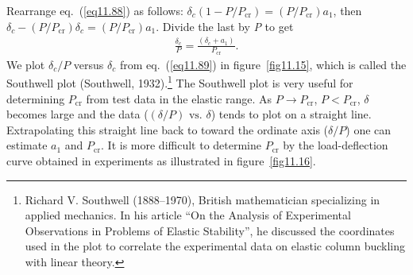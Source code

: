 \documentclass{AeroStructure-ERJohnson}
\begin{document}
Rearrange eq.~(\ref{eq11.88}) as follows: $\delta_{c}\left(1-P/P_{\textrm{cr}}\right)=\left(P/P_{\textrm{cr}}\right) a_{1}$, then $\delta_{c}-\left(P/P_{\textrm{cr}}\right) \delta_{c}=\left(P/P_{\textrm{cr}}\right) a_{1}$. Divide the last by \textit{P} to get
\begin{align}
\frac{\delta_{c}}{P}=\frac{\left(\delta_{c}+a_{1}\right)}{P_{\textrm{cr}}}. \label{eq11.89}
\end{align}
We plot $\delta_{c}/P$ versus $\delta_{c}$ from eq.~(\ref{eq11.89}) in figure~\ref{fig11.15}, which is called the Southwell plot (Southwell, 1932).\footnote{Richard V. Southwell (1888--1970), British mathematician specializing in applied mechanics. In his article ``On the Analysis of Experimental Observations in Problems of Elastic Stability'', he discussed the coordinates used in the plot to correlate the experimental data on elastic column buckling with linear theory.} The Southwell plot is very useful for determining $P_{\textrm{cr}}$ from test data in the elastic range. As $P \rightarrow P_{\textrm{cr}}$, $P<P_{\textrm{cr}}$, $\delta$ becomes large and the data ($(\delta/P) \text { vs. } \delta$) tends to plot on a straight line. Extrapolating this straight line back to toward the ordinate axis ($\delta/P$) one can estimate $a_1$ and $P_{\textrm{cr}}$. It is more difficult to determine $P_{\textrm{cr}}$ by the load-deflection curve obtained in experiments as illustrated in figure~\ref{fig11.16}.


\end{document}
